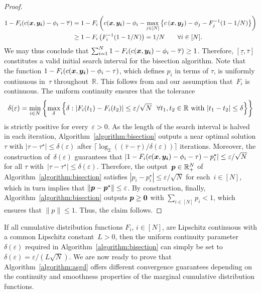 \documentclass[11pt, a4paper, oneside, reqno]{article}
\begin{document}
\begin{proof}
		\begin{align*}
		    1 - F_i(c(\boldsymbol {x},\boldsymbol {y_i})-\phi_i -\overline\tau) &= 1 - F_i \left( c(\boldsymbol {x},\boldsymbol {y_i})-\phi_i - \max_{j \in [N]} \left\{ c \left( \boldsymbol {x}, \boldsymbol {y_j} \right) - \phi_j -F_j^{-1}(1-1/N) \right\} \right) \\
		    &\geq 1 - F_i \left( F_i^{-1}(1-1/N) \right) = 1/N \qquad \forall i\in[N].
		\end{align*}
		We may thus conclude that $\sum_{i =1}^N 1 - F_i(c(\boldsymbol {x},\boldsymbol {y_i})-\phi_i -\overline\tau) \geq 1$. Therefore, $[\underline \tau, \overline \tau]$ constitutes a valid initial search interval for the bisection algorithm.
		Note that the function $1 - F_i(c(\boldsymbol {x},\boldsymbol {y_i})-\phi_i -\tau)$, which defines $p_i$ in terms of $\tau$, is uniformly continuous in~$\tau$ throughout~$\mathbb R$. This follows from \citep[Problem~14.8]{billingsley1995} and our assumption that~$F_i$ is continuous. The uniform continuity ensures that the tolerance
		\begin{align}
		    \label{eq:delta(eps)}
		    \delta(\varepsilon) = \min_{i \in N} \left\{ \max_\delta \left\{ \delta : | F_i(t_1) - F_i(t_2) | \leq \varepsilon / \sqrt{N} ~~ \forall t_1,t_2\in\mathbb{R} \text{ with } | t_1 - t_2 | \leq \delta \right\} \right\}
		\end{align}
		is strictly positive for every~$\varepsilon>0$.
		As the length of the search interval is halved in each iteration, Algorithm~\ref{algorithm:bisection} outputs a near optimal solution $\tau$ with
		$| \tau - \tau^\star | \leq \delta(\varepsilon)$ after $\lceil \log_2 ((\overline{\tau} - \underline{\tau}) / \delta(\varepsilon)) \rceil$ iterations.
		Moreover, the construction of~$\delta(\varepsilon)$ guarantees that $|1 - F_i(c(\boldsymbol {x},\boldsymbol {y_i})-\phi_i -\tau) - p_i^\star| \leq \varepsilon / \sqrt{N}$ for all $\tau$ with~$|\tau - \tau^\star| \leq \delta(\varepsilon)$. Therefore, the output~$\boldsymbol p\in\mathbb{R}^N_+$ of Algorithm~\ref{algorithm:bisection} satisfies $|p_i - p_i^\star| \leq \varepsilon / \sqrt{N} $ for each~$i\in[N]$, which in turn implies that $ \| \boldsymbol p - \boldsymbol p^\star \| \leq \varepsilon$. By construction, finally, Algorithm~\ref{algorithm:bisection} outputs $\boldsymbol p\ge \boldsymbol 0$ with $\sum_{i \in [N]} p_i < 1$, which ensures that $\| p \| \leq 1$. Thus, the claim follows.
	\end{proof}
	If all cumulative distribution functions $F_i$, $i\in[N]$, are Lipschitz continuous with a common Lipschitz constant~$L>0$, then the uniform continuity parameter~$\delta(\varepsilon)$ required in Algorithm~\ref{algorithm:bisection} can simply be set to~$\delta(\varepsilon) = \varepsilon / (L \sqrt{N})$.
	We are now ready to prove that Algorithm~\ref{algorithm:asgd} offers different convergence guarantees depending on the continuity and smoothness properties of the marginal cumulative distribution functions. 
	
\end{document}
